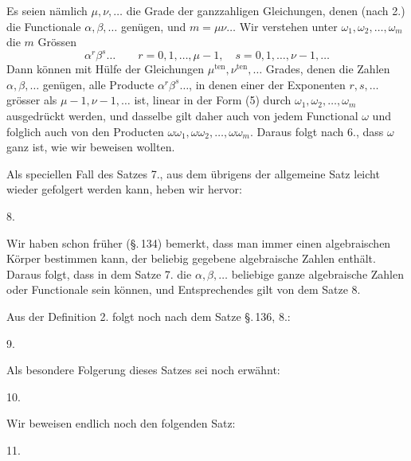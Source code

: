 Es seien nämlich $\mu, \nu, \ldots$ die Grade der ganzzahligen Gleichungen, denen (nach 2.) die Functionale $\alpha, \beta, \ldots$ genügen, und $m=\mu\nu\ldots$ Wir verstehen unter $\omega_1, \omega_2, \ldots, \omega_m$ die $m$ Grössen
\[
\alpha^r\beta^s\ldots \qquad r=0,1,\ldots,\mu-1, \quad s=0,1,\ldots,\nu-1, \ldots
\]
Dann können mit Hülfe der Gleichungen $\mu^{\text{ten}}, \nu^{\text{ten}}, \ldots$ Grades, denen die Zahlen $\alpha, \beta, \ldots$ genügen, alle Producte $\alpha^r\beta^s\ldots$, in denen einer der Exponenten $r, s, \ldots$ grösser als $\mu-1, \nu-1, \ldots$ ist, linear in der Form (5) durch $\omega_1, \omega_2, \ldots, \omega_m$ ausgedrückt werden, und dasselbe gilt daher auch von jedem Functional $\omega$ und folglich auch von den Producten $\omega\omega_1, \omega\omega_2, \ldots, \omega\omega_m$. Daraus folgt nach 6., dass $\omega$ ganz ist, wie wir beweisen wollten.

Als speciellen Fall des Satzes 7., aus dem übrigens der allgemeine Satz leicht wieder gefolgert werden kann, heben wir hervor:

8. 

Wir haben schon früher (§.\,134) bemerkt, dass man immer einen algebraischen Körper bestimmen kann, der beliebig gegebene algebraische Zahlen enthält. Daraus folgt, dass in dem Satze 7. die $\alpha, \beta, \ldots$ beliebige ganze algebraische Zahlen oder Functionale sein können, und Entsprechendes gilt von dem Satze 8.

Aus der Definition 2. folgt noch nach dem Satze §.\,136, 8.:

9. 

Als besondere Folgerung dieses Satzes sei noch erwähnt:

10. 

Wir beweisen endlich noch den folgenden Satz:

11. 
